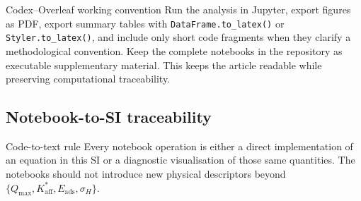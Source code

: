 \documentclass[journal=jacsat,manuscript=article]{achemso}
\begin{document}
\begin{bluebox}{Codex--Overleaf working convention}
	Run the analysis in Jupyter, export figures as PDF, export summary tables with
	\texttt{DataFrame.to\_latex()} or \texttt{Styler.to\_latex()}, and include only
	short code fragments when they clarify a methodological convention. Keep the
	complete notebooks in the repository as executable supplementary material.
	This keeps the article readable while preserving computational traceability.
\end{bluebox}
\subsection{Notebook-to-SI traceability}
\label{sec:si_notebook_traceability}

\begin{bluebox}{Code-to-text rule}
	Every notebook operation is either a direct implementation of an
	equation in this SI or a diagnostic visualisation of those same
	quantities. The notebooks should not introduce new physical
	descriptors beyond
	\(\{Q_{\max},K_{\mathrm{aff}}^{\ast},E_{\mathrm{ads}},\sigma_H\}\).
\end{bluebox}
\end{document}
